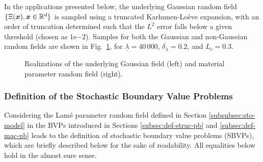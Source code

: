In the applications presented below, the underlying Gaussian random field $\{\Xi({\boldsymbol{x}}), {\boldsymbol{x}} \in \mathbb{R}^d\}$ is sampled using a truncated Karhunen-Lo\`eve expansion, with an order of truncation determined such that the $L^2$ error falls below a given threshold (chosen as $1\mathrm{e}{-2}$). Samples for both the Gaussian and non-Gaussian random fields are shown in Fig.~\ref{fig:samples}, for $\underline{\lambda} = 40\,000$, $\delta_{\lambda} = 0.2$, and $L_c = 0.3$.
\begin{figure}[!htb]
    \begin{center}
    \hspace{0.05\textwidth}
    \end{center}
    \caption[Realizations of the underlying Gaussian field and material parameter random field.]{Realizations of the underlying Gaussian field (left) and material parameter random field (right).}
    \label{fig:samples}
\end{figure}

\subsubsection{Definition of the Stochastic Boundary Value Problems}
Considering the Lam\'e parameter random field defined in Section \ref{subsubsec:sto-model} in the BVPs introduced in Sections \ref{subsec:def-struc-pb} and \ref{subsec:def-mac-pb} leads to the definition of stochastic boundary value problems (SBVPs), which are briefly described below for the sake of readability. All equalities below hold in the almost sure sense.

